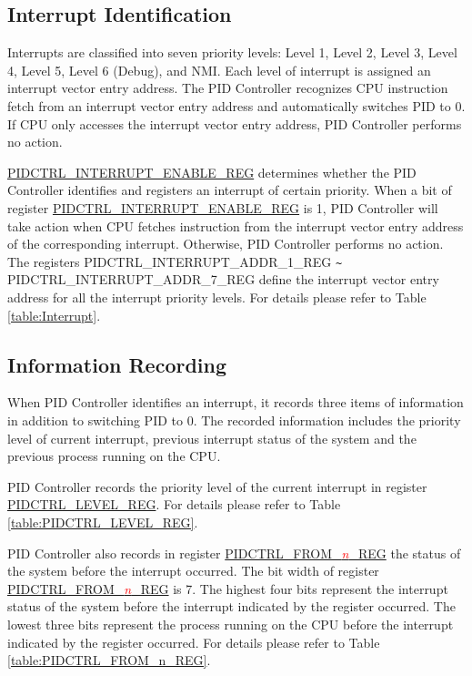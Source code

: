 \documentclass[main\_\_EN.tex]{subfiles}
\begin{document}
\subsection{Interrupt Identification}

Interrupts are classified into seven priority levels:
Level 1, Level 2, Level 3, Level 4, Level 5, Level 6 (Debug), and NMI.
Each level of interrupt is assigned an interrupt vector entry address.
The PID Controller recognizes CPU instruction fetch from an interrupt vector entry address and automatically switches PID to 0. If CPU only accesses the interrupt vector entry address, PID Controller performs no action.

\hyperref[regdesc:PIDCTRLINTERRUPTENABLEREG]{PIDCTRL\_INTERRUPT\_ENABLE\_REG} determines whether the PID Controller identifies and registers an interrupt of certain priority. When a bit of register \hyperref[regdesc:PIDCTRLINTERRUPTENABLEREG]{PIDCTRL\_INTERRUPT\_ENABLE\_REG} is 1, PID Controller will take action when CPU fetches instruction from the interrupt vector entry address of the corresponding interrupt. Otherwise, PID Controller performs no action.
The registers PIDCTRL\_INTERRUPT\_ADDR\_1\_REG \verb+~+ PIDCTRL\_INTERRUPT\_ADDR\_7\_REG define the interrupt vector entry address for all the interrupt priority levels.
For details please refer to Table \ref{table:Interrupt}.



\subsection{Information Recording}

When PID Controller identifies an interrupt, it records three items of information in addition to switching PID to 0. The recorded information includes the priority level of current interrupt, previous interrupt status of the system and the previous process running on the CPU.

PID Controller records the priority level of the current interrupt in register \hyperref[regdesc:PIDCTRLLEVELREG]{PIDCTRL\_LEVEL\_REG}. For details please refer to Table \ref{table:PIDCTRL_LEVEL_REG}.



PID Controller also records in register \hyperref[regdesc:PIDCTRLFROMnREG]{PIDCTRL\_FROM\_\textcolor{red}{\it{n}}\_REG} the status of the system before the interrupt occurred.
The bit width of register \hyperref[regdesc:PIDCTRLFROMnREG]{PIDCTRL\_FROM\_\textcolor{red}{\it{n}}\_REG} is 7. The highest four bits represent the interrupt status of the system before the interrupt indicated by the register occurred. The lowest three bits represent the process running on the CPU before the interrupt indicated by the register occurred.
For details please refer to Table \ref{table:PIDCTRL_FROM_n_REG}.
\end{document}
